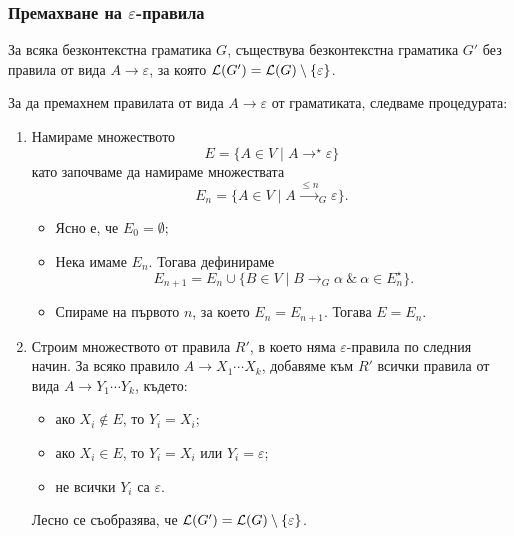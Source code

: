 \subsubsection*{Премахване на $\varepsilon$-правила}

\begin{lemma}
  За всяка безконтекстна граматика $G$, съществува безконтекстна граматика $G'$ без правила от вида $A \to \varepsilon$,
  за която $\mathcal{L}(G') = \mathcal{L}(G) \setminus \{\varepsilon\}$.
\end{lemma}
\begin{hint}
  За да премахнем правилата от вида $A \to \varepsilon$ от граматиката, следваме процедурата:
  \begin{enumerate}[1)]
  \item 
    Намираме множеството
    \[E = \{A \in V \mid A \to^\star \varepsilon\}\]
    като започваме да намираме множествата
    \[E_n = \{A \in V \mid A \stackrel{\leq n}{\to}_G \varepsilon \}.\]
    \begin{itemize}[-]
    \item
      Ясно е, че $E_0 = \emptyset$;
    \item
      Нека имаме $E_n$. Тогава дефинираме
      \[E_{n+1} = E_n \cup \{ B \in V \mid B \to_G \alpha\ \&\ \alpha \in E^\star_n\}.\]
    \item
      Спираме на първото $n$, за което $E_n = E_{n+1}$. Тогава $E = E_n$.    
    \end{itemize}
  \item
    Строим множеството от правила $R'$, в което няма $\varepsilon$-правила по следния начин.
    За всяко правило $A \to X_1\cdots X_k$,
    добавяме към $R'$ всички правила от вида $A \to Y_1\cdots Y_k$, където:
    \begin{itemize}[-]
    \item 
      ако $X_i \not\in E$, то $Y_i = X_i$;
    \item
      ако $X_i \in E$, то $Y_i = X_i$ или $Y_i = \varepsilon$;
    \item
      не всички $Y_i$ са $\varepsilon$.
    \end{itemize}
    Лесно се съобразява, че $\mathcal{L}(G') = \mathcal{L}(G) \setminus \{\varepsilon\}$.
  \end{enumerate}
\end{hint}

